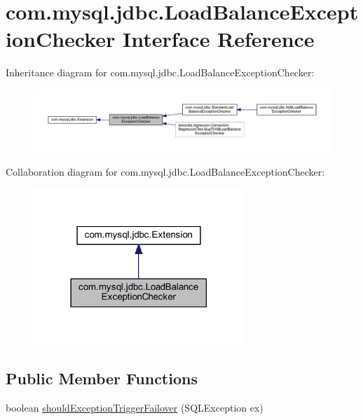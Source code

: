 \hypertarget{interfacecom_1_1mysql_1_1jdbc_1_1_load_balance_exception_checker}{}\section{com.\+mysql.\+jdbc.\+Load\+Balance\+Exception\+Checker Interface Reference}
\label{interfacecom_1_1mysql_1_1jdbc_1_1_load_balance_exception_checker}


Inheritance diagram for com.\+mysql.\+jdbc.\+Load\+Balance\+Exception\+Checker\+:
\nopagebreak
\begin{figure}[H]
\begin{center}
\leavevmode
\includegraphics[width=350pt]{interfacecom_1_1mysql_1_1jdbc_1_1_load_balance_exception_checker__inherit__graph}
\end{center}
\end{figure}


Collaboration diagram for com.\+mysql.\+jdbc.\+Load\+Balance\+Exception\+Checker\+:
\nopagebreak
\begin{figure}[H]
\begin{center}
\leavevmode
\includegraphics[width=225pt]{interfacecom_1_1mysql_1_1jdbc_1_1_load_balance_exception_checker__coll__graph}
\end{center}
\end{figure}
\subsection*{Public Member Functions}
\begin{DoxyCompactItemize}
\item 
boolean \mbox{\hyperlink{interfacecom_1_1mysql_1_1jdbc_1_1_load_balance_exception_checker_afe38ee5813abd27e1fb61d8adab72f64}{should\+Exception\+Trigger\+Failover}} (S\+Q\+L\+Exception ex)
\end{DoxyCompactItemize}


